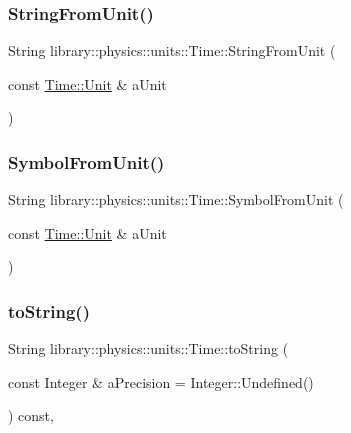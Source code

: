 \subsubsection{\texorpdfstring{String\+From\+Unit()}{StringFromUnit()}}
{\footnotesize\ttfamily String library\+::physics\+::units\+::\+Time\+::\+String\+From\+Unit (\begin{DoxyParamCaption}\item[{const \hyperlink{classlibrary_1_1physics_1_1units_1_1_time_ab876a6a05c9a2f28905f2753bfd64109}{Time\+::\+Unit} \&}]{a\+Unit }\end{DoxyParamCaption})\hspace{0.3cm}{\ttfamily [static]}}

\mbox{\label{classlibrary_1_1physics_1_1units_1_1_time_aa48f07fb50e09cd22b9b6b7a83275f39}} 
\subsubsection{\texorpdfstring{Symbol\+From\+Unit()}{SymbolFromUnit()}}
{\footnotesize\ttfamily String library\+::physics\+::units\+::\+Time\+::\+Symbol\+From\+Unit (\begin{DoxyParamCaption}\item[{const \hyperlink{classlibrary_1_1physics_1_1units_1_1_time_ab876a6a05c9a2f28905f2753bfd64109}{Time\+::\+Unit} \&}]{a\+Unit }\end{DoxyParamCaption})\hspace{0.3cm}{\ttfamily [static]}}

\mbox{\label{classlibrary_1_1physics_1_1units_1_1_time_a6f56977493a45d334bb53bc4246888c4}} 
\subsubsection{\texorpdfstring{to\+String()}{toString()}}
{\footnotesize\ttfamily String library\+::physics\+::units\+::\+Time\+::to\+String (\begin{DoxyParamCaption}\item[{const Integer \&}]{a\+Precision = {\ttfamily Integer\+:\+:Undefined()} }\end{DoxyParamCaption}) const\hspace{0.3cm}{\ttfamily [override]}, {\ttfamily [virtual]}}



